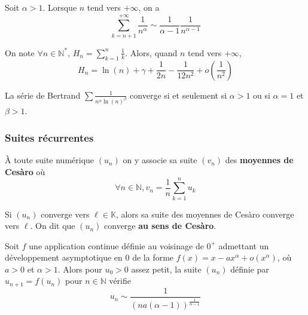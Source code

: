 
  \begin{lemma}
    Soit $\alpha > 1$. Lorsque $n$ tend vers $+\infty$, on a
    \[ \sum_{k=n+1}^{+\infty} \frac{1}{n^\alpha} \sim \frac{1}{\alpha - 1} \frac{1}{n^{\alpha - 1}} \]
  \end{lemma}


  \begin{proposition}
    On note $\forall n \in \mathbb{N}^*, \, H_n = \sum_{k=1}^{n} \frac{1}{k}$. Alors, quand $n$ tend vers $+\infty$,
    \[ H_n = \ln(n) + \gamma + \frac{1}{2n} - \frac{1}{12n^2} + o\left( \frac{1}{n^2} \right) \]
  \end{proposition}
  

  \begin{application}
    La série de Bertrand $\sum \frac{1}{n^\alpha \ln(n)^\beta}$ converge si et seulement si $\alpha > 1$ ou si $\alpha = 1$ et $\beta > 1$.
  \end{application}

  \subsubsection{Suites récurrentes}


  \begin{definition}
    À toute suite numérique $(u_n)$ on y associe sa suite $(v_n)$ des \textbf{moyennes de Cesàro} où
    \[ \forall n \in \mathbb{N}, v_n = \frac{1}{n} \sum_{k=1}^{n} u_k \]
  \end{definition}

  \begin{theorem}
    Si $(u_n)$ converge vers $\ell \in \mathbb{K}$, alors sa suite des moyennes de Cesàro converge vers $\ell$. On dit que $(u_n)$ converge \textbf{au sens de Cesàro}.
  \end{theorem}


  \begin{proposition}
    Soit $f$ une application continue définie au voisinage de $0^+$ admettant
    un développement asymptotique en $0$ de la forme $f(x) = x - ax^\alpha + o(x^\alpha)$, où $a > 0$ et $\alpha > 1$. Alors pour $u_0 > 0$ assez petit, la suite $(u_n)$ définie par $u_{n+1} = f(u_n)$ pour $n \in \mathbb{N}$ vérifie
    \[ u_n \sim \frac{1}{(na(\alpha-1))^{\frac{1}{\alpha-1}}} \]
  \end{proposition}

